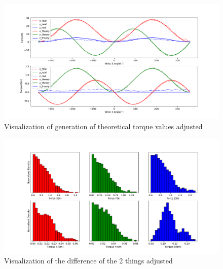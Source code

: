 
\begin{figure}[h]
    \centering
    \includegraphics[width=\linewidth]{figs/chp3/ft_sensor_theory_adjust.pdf}
    \caption{Visualization of generation of theoretical torque values adjusted}
    \label{fig:ft_sensor_theory_adjust}
\end{figure}

\begin{figure}[h]
    \centering
    \includegraphics[width=\linewidth]{figs/chp3/ft_sensor_theory_adjust_hist.pdf}
    \caption{Visualization of the difference of the 2 things adjusted}
    \label{fig:ft_sensor_theory_adjust_hist}
\end{figure}

